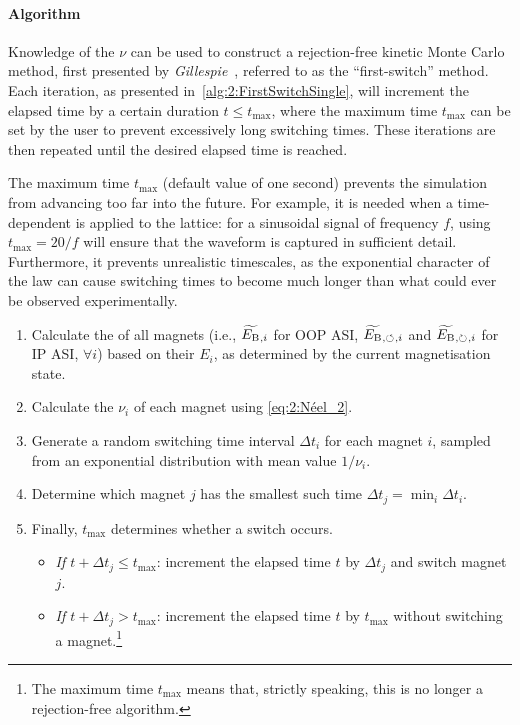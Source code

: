\paragraph{Algorithm}
Knowledge of the  $\nu$ can be used to construct a rejection-free kinetic Monte Carlo method, first presented by \textit{Gillespie}~\cite{gillespie1976general}, referred to as the ``first-switch'' method.
Each iteration, as presented in~\cref{alg:2:FirstSwitchSingle}, will increment the elapsed time by a certain duration $t \leq t_\mathrm{max}$, where the maximum time $t_\mathrm{max}$ can be set by the user to prevent excessively long switching times.
These iterations are then repeated until the desired elapsed time is reached. \par
The maximum time $t_\mathrm{max}$ (default value of one second) prevents the simulation from advancing too far into the future.
For example, it is needed when a time-dependent  is applied to the lattice: for a sinusoidal signal of frequency $f$, using $t_{\mathrm{max}}=20/f$ will ensure that the waveform is captured in sufficient detail.
Furthermore, it prevents unrealistic timescales, as the exponential character of the  law can cause switching times to become much longer than what could ever be observed experimentally. \par
\begin{algorithm}
	\label{alg:2:FirstSwitchSingle}
	\begin{enumerate}[rightmargin=15pt]
		\item Calculate the  of all magnets (i.e., $\widetilde{E_\mathrm{B}}{}_{,i}$ for OOP ASI, $\widetilde{E_\mathrm{B}}{}_{,\circlearrowleft}{}_{,i}$ and $\widetilde{E_\mathrm{B}}{}_{,\circlearrowright}{}_{,i}$ for IP ASI, $\forall i$) based on their  $E_i$, as determined by the current magnetisation state.
		\item Calculate the  $\nu_i$ of each magnet using \cref{eq:2:Néel_2}.
		\item Generate a random switching time interval $\Delta t_i$ for each magnet $i$, sampled from an exponential distribution with mean value $1/\nu_i$.
		\item Determine which magnet $j$ has the smallest such time $\Delta t_j = \min_i \Delta t_i$.
		\item Finally, $t_\mathrm{max}$ determines whether a switch occurs.
		\begin{itemize}
			\item \textit{If $t + \Delta t_j \leq t_\mathrm{max}$}: increment the elapsed time $t$ by $\Delta t_j$ and switch magnet $j$.
			\item \textit{If $t + \Delta t_j > t_\mathrm{max}$}: increment the elapsed time $t$ by $t_\mathrm{max}$ without switching a magnet.\footnote{The maximum time $t_\mathrm{max}$ means that, strictly speaking, this is no longer a rejection-free algorithm.}
		\end{itemize}
	\end{enumerate} %
\end{algorithm}
